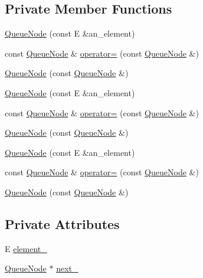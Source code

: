 \subsection*{Private Member Functions}
\begin{DoxyCompactItemize}
\item 
\mbox{\hyperlink{class_queue_node_a2c22feef35d910bec7138598e8784e25}{Queue\+Node}} (const E \&an\+\_\+element)
\item 
const \mbox{\hyperlink{class_queue_node}{Queue\+Node}} \& \mbox{\hyperlink{class_queue_node_a8635bbe6310e011ef4fcf1a01566dbb7}{operator=}} (const \mbox{\hyperlink{class_queue_node}{Queue\+Node}} \&)
\item 
\mbox{\hyperlink{class_queue_node_a35adcad7a84db46784907cf58106d585}{Queue\+Node}} (const \mbox{\hyperlink{class_queue_node}{Queue\+Node}} \&)
\item 
\mbox{\hyperlink{class_queue_node_a2c22feef35d910bec7138598e8784e25}{Queue\+Node}} (const E \&an\+\_\+element)
\item 
const \mbox{\hyperlink{class_queue_node}{Queue\+Node}} \& \mbox{\hyperlink{class_queue_node_a8635bbe6310e011ef4fcf1a01566dbb7}{operator=}} (const \mbox{\hyperlink{class_queue_node}{Queue\+Node}} \&)
\item 
\mbox{\hyperlink{class_queue_node_a35adcad7a84db46784907cf58106d585}{Queue\+Node}} (const \mbox{\hyperlink{class_queue_node}{Queue\+Node}} \&)
\item 
\mbox{\hyperlink{class_queue_node_a2c22feef35d910bec7138598e8784e25}{Queue\+Node}} (const E \&an\+\_\+element)
\item 
const \mbox{\hyperlink{class_queue_node}{Queue\+Node}} \& \mbox{\hyperlink{class_queue_node_a8635bbe6310e011ef4fcf1a01566dbb7}{operator=}} (const \mbox{\hyperlink{class_queue_node}{Queue\+Node}} \&)
\item 
\mbox{\hyperlink{class_queue_node_a35adcad7a84db46784907cf58106d585}{Queue\+Node}} (const \mbox{\hyperlink{class_queue_node}{Queue\+Node}} \&)
\end{DoxyCompactItemize}
\subsection*{Private Attributes}
\begin{DoxyCompactItemize}
\item 
E \mbox{\hyperlink{class_queue_node_a593f0f5862848c1e9063d32ea3438b58}{element\+\_\+}}
\item 
\mbox{\hyperlink{class_queue_node}{Queue\+Node}} $\ast$ \mbox{\hyperlink{class_queue_node_aa1fc000fc7f7a83697cef9bd3ab89af7}{next\+\_\+}}
\end{DoxyCompactItemize}
